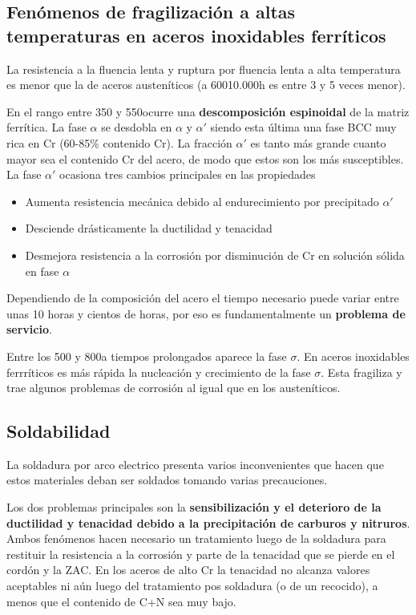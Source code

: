 \subsection{Fenómenos de fragilización a altas temperaturas en aceros inoxidables ferríticos}

La resistencia a la fluencia lenta y ruptura por fluencia lenta a alta temperatura es menor que la de aceros austeníticos (a 600\grad 10.000h es entre 3 y 5 veces menor).

En el rango entre 350 y 550\grad ocurre una \textbf{descomposición espinoidal} de la matriz ferrítica. La fase $\alpha$ se desdobla en $\alpha$ y $\alpha'$ siendo esta última una fase BCC muy rica en Cr (60-85\% contenido Cr). La fracción $\alpha'$ es tanto más grande cuanto mayor sea el contenido Cr del acero, de modo que estos son los más susceptibles. La fase $\alpha'$ ocasiona tres cambios principales en las propiedades

\begin{itemize}
	\item Aumenta resistencia mecánica debido al endurecimiento por precipitado $\alpha'$
	\item Desciende drásticamente la ductilidad y tenacidad
	\item Desmejora resistencia a la corrosión por disminución de Cr en solución sólida en fase $\alpha$
\end{itemize}

Dependiendo de la composición del acero el tiempo necesario puede variar entre unas 10 horas y cientos de horas, por eso es fundamentalmente un \textbf{problema de servicio}.

Entre los 500 y 800\grad a tiempos prolongados aparece la fase $\sigma$. En aceros inoxidables ferrríticos es más rápida la nucleación y crecimiento de la fase $\sigma$. Esta fragiliza y trae algunos problemas de corrosión al igual que en los austeníticos.

\subsection{Soldabilidad}

La soldadura por arco electrico presenta varios inconvenientes que hacen que estos materiales deban ser soldados tomando varias precauciones.

Los dos problemas principales son la \textbf{sensibilización y el deterioro de la ductilidad y tenacidad debido a la precipitación de carburos y nitruros}. Ambos fenómenos hacen necesario un tratamiento luego de la soldadura para restituir la resistencia a la corrosión y parte de la tenacidad que se pierde en el cordón y la ZAC. En los aceros de alto Cr la tenacidad no alcanza valores aceptables ni aún luego del tratamiento pos soldadura (o de un recocido), a menos que el contenido de C+N sea muy bajo.

